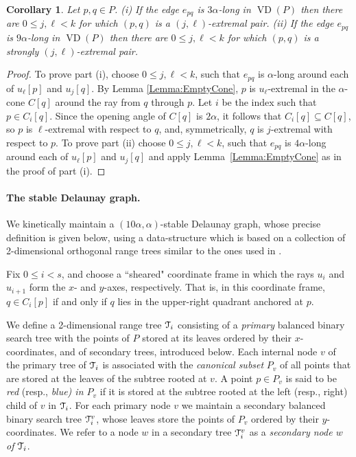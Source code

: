\documentclass[letter,11pt]{article}
\newtheorem{corollary}[theorem]{Corollary}
\def\T{\EuScript{T}}
\def\VD{\mathop{\mathrm{VD}}}
\begin{document}
\begin{corollary}\label{Corol:ExtremalPair}
Let $p,q\in P$. 
\noindent (i) If the edge $e_{pq}$ is $3\alpha$-long in $\VD(P)$
then there are $0\leq j,\ell< k$ for which $(p,q)$
is a $(j,\ell)$-extremal pair.
\noindent(ii) If the edge $e_{pq}$ is $9\alpha$-long in $\VD(P)$
then there are $0\leq j,\ell < k$ for which $(p,q)$
is a strongly $(j,\ell)$-extremal pair.
\end{corollary}
\begin{proof}
To prove part (i), choose $0\leq j, \ell < k$, such that $e_{pq}$ is
$\alpha$-long around each of  $u_{\ell}[p]$ and  $u_{j}[q]$. By Lemma \ref{Lemma:EmptyCone}, $p$ is $u_\ell$-extremal in the $\alpha$-cone $C[q]$ around the ray from $q$ through $p$. Let $i$ be the index such that $p\in C_i[q]$. Since the opening angle of $C[q]$ is $2\alpha$, it follows that $C_i[q]\subseteq C[q]$, so $p$ is $\ell$-extremal with respect to $q$, and, symmetrically, $q$ is $j$-extremal with respect to $p$. To prove part (ii) choose $0\leq
j,\ell< k$, such that $e_{pq}$ is $4\alpha$-long around each of $u_{\ell}[p]$
and $u_{j}[q]$ and apply
Lemma~\ref{Lemma:EmptyCone} as in the proof of part (i).
\end{proof}

\paragraph{The stable Delaunay graph.}
We kinetically maintain a
$(10\alpha,\alpha)$-stable Delaunay graph, whose precise definition is given below,
using a data-structure which is based on a collection of 2-dimensional orthogonal range trees similar to the ones used in \cite{KineticNeighbors}.

Fix $0\leq i< s$, and choose a ``sheared" coordinate frame in
 which the rays $u_i$ and $u_{i+1}$ form the $x$- and $y$-axes,
 respectively. That is, in this coordinate frame, $q\in C_i[p]$ if and
 only if $q$ lies in the upper-right quadrant anchored at $p$. 
 
We define a 2-dimensional range tree $\T_i$ consisting of a \textit{primary} balanced binary search tree with the
points of $P$ stored at its leaves ordered by their $x$-coordinates, and of secondary trees, introduced below.
Each internal node $v$ of the primary tree of $\T_i$ is associated with the
\emph{canonical subset} $P_v$ of all points that are stored at the
leaves of the subtree rooted at $v$. A point $p\in P_v$ is said to be
\emph{red} (resp., {\it blue) in $P_v$} if it is stored at the subtree rooted at
the left (resp., right) child of $v$ in $\T_i$. For each primary node
$v$ we maintain a secondary balanced binary search tree $\T_i^v$, whose
leaves store the points of $P_v$ ordered by their $y$-coordinates.
We refer to a node $w$ in a secondary
tree  $\T_i^v$  as a {\em secondary node $w$ of $\T_i$}.
\end{document}
